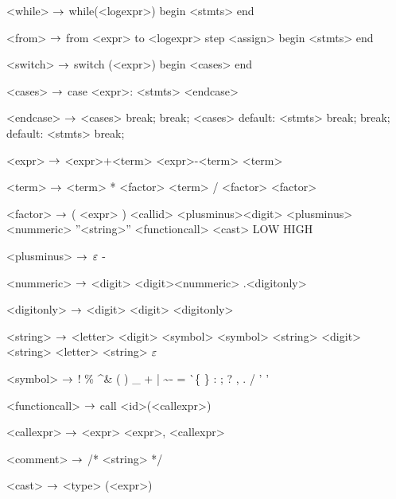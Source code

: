 \begin{grammar}
<while> $\rightarrow$ while(<logexpr>)
		begin
			<stmts>
		end
		
<from> $\rightarrow$ from <expr> to <logexpr> step <assign>
	begin
		<stmts>
	end

<switch> $\rightarrow$ switch (<expr>)
		begin
			<cases>
		end

<cases> $\rightarrow$ case <expr>:
			<stmts>
		<endcase>
		
<endcase> $\rightarrow$ <cases>
		\alt break;
		\alt break;
		<cases>
		\alt default:
			<stmts>
			break;
		\alt break;
		default:
			<stmts>
			break;

<expr> $\rightarrow$ <expr>+<term>
	\alt<expr>-<term>
	\alt<term>

<term> $\rightarrow$ <term> * <factor>
	\alt <term> / <factor>
	\alt <factor>

<factor> $\rightarrow$ ( <expr> )
	\alt <callid>
	\alt <plusminus><digit>
	\alt <plusminus><nummeric>
	\alt ''<string>''
	\alt <functioncall> 
	\alt <cast>
	\alt LOW
	\alt HIGH

<plusminus> $\rightarrow$ $\varepsilon$
	\alt -

<nummeric> $\rightarrow$ <digit>
	\alt <digit><nummeric>
	\alt .<digitonly>

<digitonly> $\rightarrow$ <digit>
	\alt <digit> <digitonly>

<string> $\rightarrow$ <letter>
\alt <digit>
\alt <symbol>
\alt <symbol> <string>
\alt <digit> <string>
\alt <letter> <string>
\alt $\varepsilon$

<symbol> $\rightarrow$ !
\alt \%
\alt \^
\alt \&
\alt *
\alt (
\alt )
\alt \_
\alt +
\alt |
\alt \~
\alt -
\alt =
\alt \`
\alt \{
\alt \}
\alt [
\alt ]
\alt :
\alt ;
\alt ?
\alt ,
\alt .
\alt /
\alt ' '

<functioncall> $\rightarrow$ call <id>(<callexpr>)

<callexpr> $\rightarrow$ <expr>
\alt <expr>, <callexpr>

<comment> $\rightarrow$ /* <string> */

<cast> $\rightarrow$ <type> (<expr>)

\end{grammar}